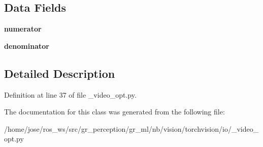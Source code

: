 \subsection*{Data Fields}
\begin{DoxyCompactItemize}
\item 
\mbox{\label{classtorchvision_1_1io_1_1__video__opt_1_1Timebase_af754379f00a63b37416371751b947590}} 
{\bfseries numerator}
\item 
\mbox{\label{classtorchvision_1_1io_1_1__video__opt_1_1Timebase_a2d00cf5951af3aa74085ae7e35bb9ead}} 
{\bfseries denominator}
\end{DoxyCompactItemize}


\subsection{Detailed Description}


Definition at line 37 of file \+\_\+video\+\_\+opt.\+py.



The documentation for this class was generated from the following file\+:\begin{DoxyCompactItemize}
\item 
/home/jose/ros\+\_\+ws/src/gr\+\_\+perception/gr\+\_\+ml/nb/vision/torchvision/io/\+\_\+video\+\_\+opt.\+py\end{DoxyCompactItemize}
